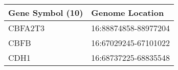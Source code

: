 \begin{tabular}{ll}
\toprule
Gene Symbol (10) &      Genome Location \\
\midrule
         CBFA2T3 & 16:88874858-88977204 \\
            CBFB & 16:67029245-67101022 \\
            CDH1 & 16:68737225-68835548 \\
\bottomrule
\end{tabular}
